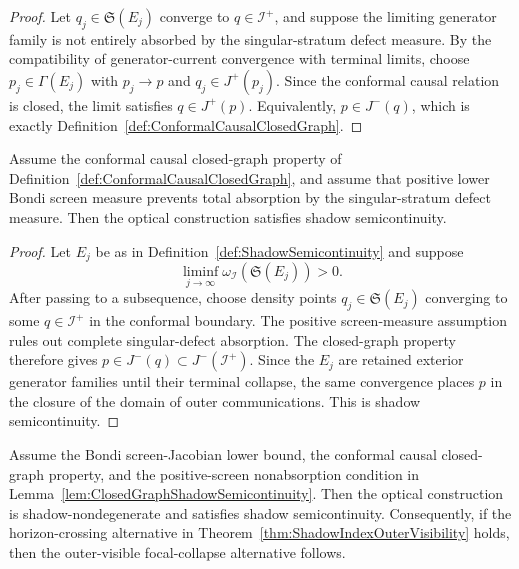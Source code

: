 \begin{proof}
Let $q_j\in\mathfrak S(E_j)$ converge to $q\in\mathscr I^+$, and suppose the limiting generator family is not entirely absorbed by the singular-stratum defect measure. By the compatibility of generator-current convergence with terminal limits, choose $p_j\in\Gamma(E_j)$ with $p_j\to p$ and $q_j\in J^+(p_j)$. Since the conformal causal relation is closed, the limit satisfies $q\in J^+(p)$. Equivalently, $p\in J^-(q)$, which is exactly Definition~\ref{def:ConformalCausalClosedGraph}.
\end{proof}

\begin{lemma}\label{lem:ClosedGraphShadowSemicontinuity}
Assume the conformal causal closed-graph property of Definition~\ref{def:ConformalCausalClosedGraph}, and assume that positive lower Bondi screen measure prevents total absorption by the singular-stratum defect measure. Then the optical construction satisfies shadow semicontinuity.
\end{lemma}

\begin{proof}
Let $E_j$ be as in Definition~\ref{def:ShadowSemicontinuity} and suppose
\[
    \liminf_{j\to\infty}\omega_{\mathscr I}(\mathfrak S(E_j))>0 .
\]
After passing to a subsequence, choose density points $q_j\in\mathfrak S(E_j)$ converging to some $q\in\mathscr I^+$ in the conformal boundary. The positive screen-measure assumption rules out complete singular-defect absorption. The closed-graph property therefore gives $p\in J^-(q)\subset J^-(\mathscr I^+)$. Since the $E_j$ are retained exterior generator families until their terminal collapse, the same convergence places $p$ in the closure of the domain of outer communications. This is shadow semicontinuity.
\end{proof}

\begin{theorem}\label{thm:ScreenMapShadowRoute}
Assume the Bondi screen-Jacobian lower bound, the conformal causal closed-graph property, and the positive-screen nonabsorption condition in Lemma~\ref{lem:ClosedGraphShadowSemicontinuity}. Then the optical construction is shadow-nondegenerate and satisfies shadow semicontinuity. Consequently, if the horizon-crossing alternative in Theorem~\ref{thm:ShadowIndexOuterVisibility} holds, then the outer-visible focal-collapse alternative follows.
\end{theorem}

